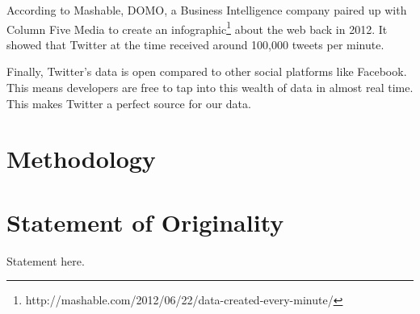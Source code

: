 According to Mashable, DOMO, a Business Intelligence company paired up with Column Five Media to
create an infographic\footnote{http://mashable.com/2012/06/22/data-created-every-minute/} about the
web back in 2012. It showed that Twitter at the time received around 100,000 tweets per minute.

Finally, Twitter's data is open compared to other social platforms like Facebook. This means
developers are free to tap into this wealth of data in almost real time. This makes Twitter a
perfect source for our data.

\section{Methodology}
\label{sec:methodology}

\section{Statement of Originality}

Statement here.

